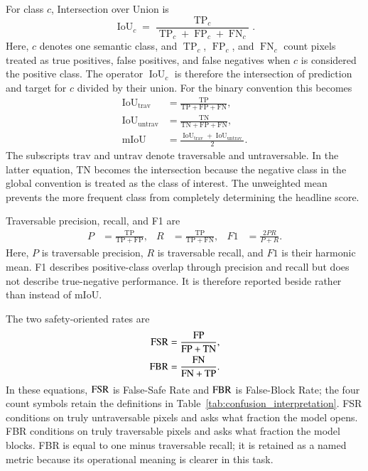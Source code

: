 For class $c$, Intersection over Union is
\begin{equation}
 \operatorname{IoU}_c=
 \frac{\operatorname{TP}_c}
 {\operatorname{TP}_c+\operatorname{FP}_c+\operatorname{FN}_c}.
\end{equation}
Here, $c$ denotes one semantic class, and $\operatorname{TP}_c$,
$\operatorname{FP}_c$, and $\operatorname{FN}_c$ count pixels treated as true
positives, false positives, and false negatives when $c$ is considered the
positive class. The operator $\operatorname{IoU}_c$ is therefore the
intersection of prediction and target for $c$ divided by their union.
For the binary convention this becomes
\begin{align}
 \operatorname{IoU}_{\mathrm{trav}}
 &=\frac{\mathrm{TP}}{\mathrm{TP}+\mathrm{FP}+\mathrm{FN}},\\
 \operatorname{IoU}_{\mathrm{untrav}}
 &=\frac{\mathrm{TN}}{\mathrm{TN}+\mathrm{FP}+\mathrm{FN}},\\
 \operatorname{mIoU}
 &=\frac{\operatorname{IoU}_{\mathrm{trav}}
 +\operatorname{IoU}_{\mathrm{untrav}}}{2}.
\end{align}
The subscripts $\mathrm{trav}$ and $\mathrm{untrav}$ denote traversable and
untraversable. In the latter equation, TN becomes the intersection because the
negative class in the global convention is treated as the class of interest.
The unweighted mean prevents the more frequent class from completely
determining the headline score.

Traversable precision, recall, and F1 are
\begin{align}
 P&=\frac{\mathrm{TP}}{\mathrm{TP}+\mathrm{FP}},&
 R&=\frac{\mathrm{TP}}{\mathrm{TP}+\mathrm{FN}},&
 F1&=\frac{2PR}{P+R}.
\end{align}
Here, $P$ is traversable precision, $R$ is traversable recall, and $F1$ is
their harmonic mean. F1 describes positive-class overlap through precision
and recall but does not
describe true-negative performance. It is therefore reported beside rather
than instead of mIoU.

The two safety-oriented rates are
\begin{align}
 \mathrm{FSR}&=\frac{\mathrm{FP}}{\mathrm{FP}+\mathrm{TN}},
 \label{eq:final_fsr}\\
 \mathrm{FBR}&=\frac{\mathrm{FN}}{\mathrm{FN}+\mathrm{TP}}.
\label{eq:final_fbr}
\end{align}
In these equations, $\mathrm{FSR}$ is False-Safe Rate and $\mathrm{FBR}$ is False-Block Rate;
the four count symbols retain the definitions in
Table~\ref{tab:confusion_interpretation}. FSR conditions on truly
untraversable pixels and asks what fraction the model
opens. FBR conditions on truly traversable pixels and asks what fraction the
model blocks. FBR is equal to one minus traversable recall; it is retained as
a named metric because its operational meaning is clearer in this task.

